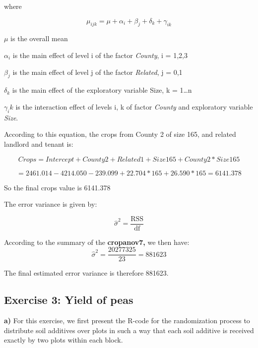 \documentclass[
]{article}
\begin{document}
where

\[
\mu_{ijk} = \mu + \alpha_i + \beta_j + \delta_k + \gamma_{ik}
\]

\(\mu\) is the overall mean

\(\alpha_i\) is the main effect of level i of the factor \emph{County},
i = 1,2,3

\(\beta_j\) is the main effect of level j of the factor \emph{Related},
j = 0,1

\(\delta_k\) is the main effect of the exploratory variable Size, k =
1\ldots n

\(\gamma_ik\) is the interaction effect of levels i, k of factor
\emph{County} and exploratory variable \emph{Size}.

According to this equation, the crops from County 2 of size 165, and
related landlord and tenant is:

\[
Crops = Intercept + County2 + Related1 + Size 165 + County2*Size165
\]

\[
= 2461.014-4214.050-239.099+22.704*165+26.590*165 = 6141.378
\]

So the final crops value is 6141.378

The error variance is given by:

\[
\hat{\sigma}^2 = \frac{\text{RSS}}{\text{df}}
\]

According to the summary of the \textbf{cropanov7,} we then have:\[
\hat{\sigma}^2 = \frac{20277325}{23} = 881623
\]

The final estimated error variance is therefore 881623.

\subsection{Exercise 3: Yield of peas}\label{exercise-3-yield-of-peas}

\textbf{a)} For this exercise, we first present the R-code for the
randomization process to distribute soil additives over plots in such a
way that each soil additive is received exactly by two plots within each
block.
\end{document}
